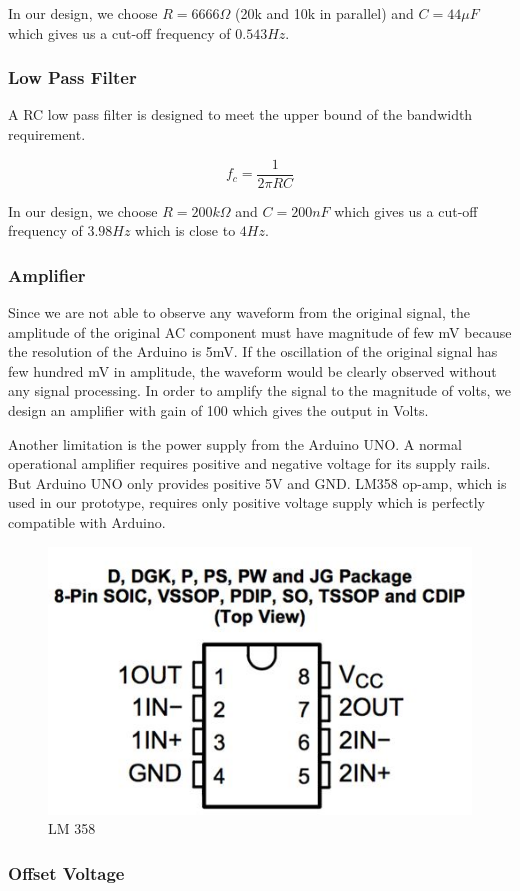 In our design, we choose $R = 6666 \Omega$ (20k and 10k in parallel) and $C = 44 \mu F$ which gives us a cut-off frequency of $0.543 Hz$.

\subsubsection{Low Pass Filter}

A RC low pass filter is designed to meet the upper bound of the bandwidth requirement.

\begin{equation}
f_c = \frac{1}{2\pi RC}
\end{equation}

In our design, we choose $R = 200k \Omega$ and $C = 200nF$ which gives us a cut-off frequency of $3.98 Hz$ which is close to $4 Hz$.

\subsubsection{Amplifier}

Since we are not able to observe any waveform from the original signal, the amplitude of the original AC component must have magnitude of few mV because the resolution of the Arduino is 5mV. If the oscillation of the original signal has few hundred mV in amplitude, the waveform would be clearly observed without any signal processing. In order to amplify the signal to the magnitude of volts, we design an amplifier with gain of 100 which gives the output in Volts. 

Another limitation is the power supply from the Arduino UNO. A normal operational amplifier requires positive and negative voltage for its supply rails. But Arduino UNO only provides positive 5V and GND. LM358 op-amp, which is used in our prototype, requires only positive voltage supply which is perfectly compatible with Arduino.

\begin{figure}[H]
	\centering
	\includegraphics[width=0.3\linewidth]{georgepic5.jpg}
	\caption{LM 358 \cite{george12}}
\end{figure}

\subsubsection{Offset Voltage}

